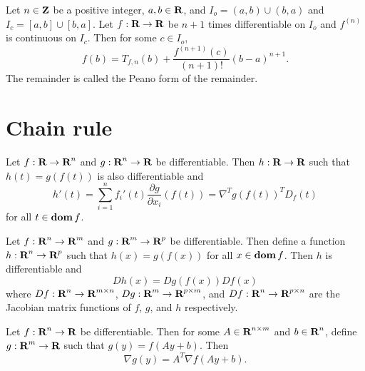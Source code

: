 \documentclass[10pt, twoside]{book}   	%
\begin{document}
\begin{theorem}
\label{theorem:taylor-lagrange}
Let $n\in{\mbox{\bf Z}}$ be a positive integer, $a,b\in{\mbox{\bf R}}$,
and $I_o = (a,b) \cup (b,a)$ and $I_c = [a,b] \cup [b,a]$.
Let $f:{\mbox{\bf R}}\to{\mbox{\bf R}}$ be $n+1$ times differentiable on $I_o$
and $f^{(n)}$ is continuous on $I_c$.
Then for some $c \in I_o$,
\begin{equation}
\label{eq:taylor-lagrange}
f(b) = T_{f,n}(b) + \frac{f^{(n+1)}(c)}{(n+1)!}(b-a)^{n+1}.
\end{equation}
The remainder is called the Peano form of the remainder.
\end{theorem}



\section{Chain rule}

\begin{theorem}
\label{theorem:chain-rule}
Let $f:{\mbox{\bf R}}\to{\mbox{\bf R}}^n$ and $g:{\mbox{\bf R}}^n\to{\mbox{\bf R}}$ be differentiable.
Then $h:{\mbox{\bf R}}\to{\mbox{\bf R}}$ such that $h(t) = g(f(t))$ is also differentiable and
\[
h'(t) = \sum_{i=1}^n f_i'(t) \frac{\partial g}{\partial x_i} (f(t))
= \nabla^T g(f(t))^T D_f (t)
\]
for all $t\in\mathop{\bf dom} f$.
\end{theorem}

\begin{corollary}
\label{corollary:chain-rule-gen}
Let $f:{\mbox{\bf R}}^n\to{\mbox{\bf R}}^m$ and $g:{\mbox{\bf R}}^m\to{\mbox{\bf R}}^p$ be differentiable.
Then define a function $h:{\mbox{\bf R}}^n\to{\mbox{\bf R}}^p$ such that $h(x) = g(f(x))$ for all $x\in\mathop{\bf dom} f$.
Then $h$ is differentiable and
\begin{equation}
\label{eq:chain-rule-gen}
D h(x) = Dg(f(x)) Df(x)
\end{equation}
where
$D f:{\mbox{\bf R}}^n\to{\mbox{\bf R}}^{m\times n}$,
$D g:{\mbox{\bf R}}^m\to{\mbox{\bf R}}^{p\times m}$,
and $D f:{\mbox{\bf R}}^n\to{\mbox{\bf R}}^{p\times n}$
are the Jacobian matrix functions of $f$, $g$, and $h$ respectively.
\end{corollary}

\begin{corollary}
\label{corollary:dixu}
Let $f:{\mbox{\bf R}}^n\to{\mbox{\bf R}}$ be differentiable.
Then for some $A\in{\mbox{\bf R}}^{n\times m}$ and $b\in{\mbox{\bf R}}^n$,
define $g:{\mbox{\bf R}}^m\to{\mbox{\bf R}}$ such that $g(y) = f(Ay+b)$.
Then
\begin{equation}
\label{eq:dixu}
\nabla g(y) = A^T \nabla f(Ay+b).
\end{equation}
\end{corollary}
\end{document}
